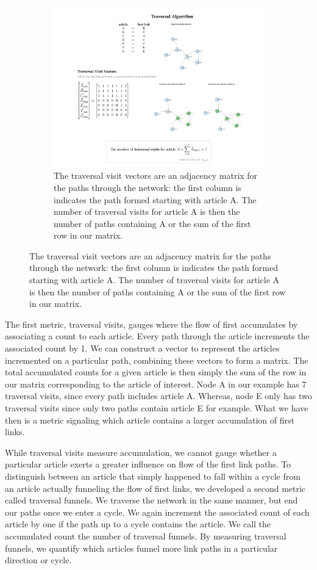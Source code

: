 \documentclass[twoside]{article}
\begin{document}
\begin{figure}[H]
\centering
    \caption{traversal visit algorithm on a sample network}
\begin{subfigure}[b]{\textwidth}
    \includegraphics[width=\textwidth]{graphics/traversal_visit_algo_figure.pdf}
    \caption{The traversal visit vectors are an adjacency matrix for the paths through the network: the first column is indicates the path formed starting with article A. The number of traversal visits for article A is then the number of paths containing A or the sum of the first row in our matrix.}
\end{subfigure}
\end{figure}

The first metric, traversal visits, gauges where the flow of first accumulates by associating a count to each article. Every path through the article increments the associated count by 1. We can construct a vector to represent the articles incremented on a particular path, combining these vectors to form a matrix. The total accumulated counts for a given article is then simply the sum of the row in our matrix corresponding to the article of interest. Node A in our example has 7 traversal visits, since every path includes article A. Whereas, node E only has two traversal visits since only two paths contain article E for example.
What we have then is a metric signaling which article contains a larger accumulation of first links.


While traversal visits measure accumulation, we cannot gauge whether a particular article exerts a greater influence on flow of the first link paths. To distinguish between an article that simply happened to fall within a cycle from an article actually funneling the flow of first links, we developed a second metric called traversal funnels. We traverse the network in the same manner, but end our paths once we enter a cycle. We again increment the associated count of each article by one if the path up to a cycle contains the article. We call the accumulated count the number of traversal funnels. By measuring traversal funnels, we quantify
which articles funnel more link paths in a particular direction or cycle.
\end{document}
